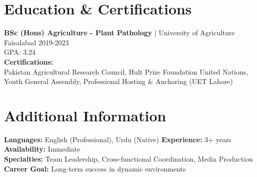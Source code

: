 \documentclass[10pt]{article}
\begin{document}
\section{Education \& Certifications}
\textbf{BSc (Hons) Agriculture - Plant Pathology} | University of Agriculture Faisalabad \hfill 2019-2023 \\
GPA: 3.24 \\[4pt]
\textbf{Certifications:} \\
Pakistan Agricultural Research Council, Hult Prize Foundation United Nations, Youth General Assembly, Professional Hosting \& Anchoring (UET Lahore)


\section{Additional Information}
\textbf{Languages:} English (Professional), Urdu (Native) \quad \textbf{Experience:} 3+ years \quad \textbf{Availability:} Immediate \\
\textbf{Specialties:} Team Leadership, Cross-functional Coordination, Media Production \quad \textbf{Career Goal:} Long-term success in dynamic environments
\end{document}
